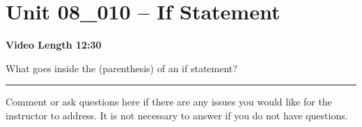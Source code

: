 \documentclass[letterpaper,12pt]{exam}
\newcommand{\unit}{Unit 08}
\begin{document}
\section*{\unit\_010 -- If Statement} %
\par{\selectfont\textbf{Video Length 12:30}}

\begin{questions}
\begin{samepage}
    \question What goes inside the (parenthesis) of an if statement?
    \vspace{5mm}
\end{samepage}


\begin{samepage}
    \begin{center}
    \rule{0.8\textwidth}{.4pt}
    \end{center}
	\question Comment or ask questions here if there are any issues you would like for the instructor to address.  It is not necessary to answer if you do not have questions.
	\vspace{30mm}
\end{samepage}

\end{questions}
\end{document}
